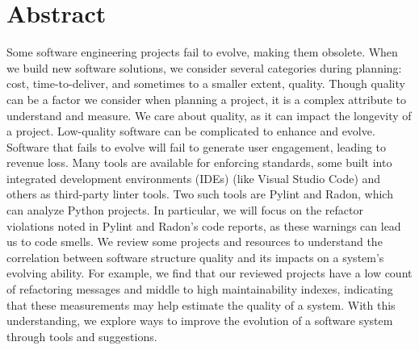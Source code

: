 \section*{Abstract} \label{sectionAbstract}


Some software engineering projects fail to evolve, making them obsolete. When we build new software solutions, we consider several categories during planning: cost, time-to-deliver, and sometimes to a smaller extent, quality. Though quality can be a factor we consider when planning a project, it is a complex attribute to understand and measure.
We care about quality, as it can impact the longevity of a project. Low-quality software can be complicated to enhance and evolve. Software that fails to evolve will fail to generate user engagement, leading to revenue loss.
Many tools are available for enforcing standards, some built into integrated development environments (IDEs) (like Visual Studio Code) and others as third-party linter tools. Two such tools are Pylint and Radon, which can analyze Python projects. In particular, we will focus on the refactor violations noted in Pylint and Radon's code reports, as these warnings can lead us to code smells.
We review some projects and resources to understand the correlation between software structure quality and its impacts on a system's evolving ability. For example, we find that our reviewed projects have a low count of refactoring messages and middle to high maintainability indexes, indicating that these measurements may help estimate the quality of a system.
With this understanding, we explore ways to improve the evolution of a software system through tools and suggestions.
